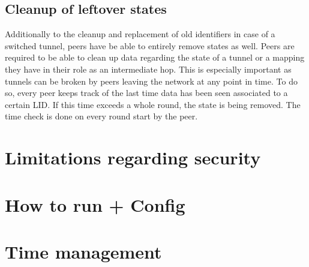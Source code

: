 \documentclass[paper=letter, fontsize=12pt]{article}
\begin{document}
\subsection{Cleanup of leftover states}
\label{sec:function:cleanup}
Additionally to the cleanup and replacement of old identifiers in case of a switched tunnel, peers have be able to entirely remove states as well. Peers are required to be able to clean up data regarding the state of a tunnel or a mapping they have in their role as an intermediate hop. This is especially important as tunnels can be broken by peers leaving the network at any point in time. To do so, every peer keeps track of the last time data has been seen associated to a certain LID. If this time exceeds a whole round, the state is being removed. The time check is done on every round start by the peer.

\section{Limitations regarding security}

\section{How to run + Config}

\section{Time management}



\end{document}
